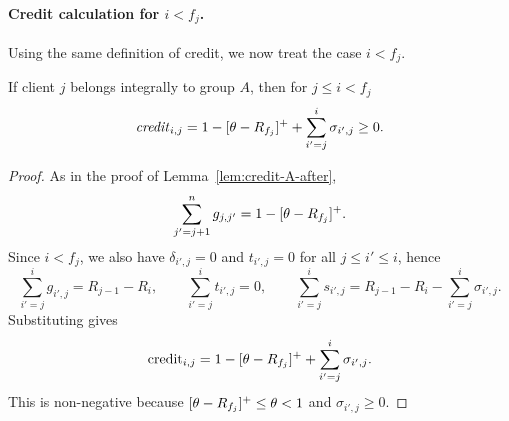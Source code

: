\paragraph{Credit calculation for \texorpdfstring{$i < f_j$}{i < f\_j}.}

Using the same definition of credit, we now treat the case $i < f_j$.


\begin{lemma}
    \label{lem:credit-A-before}
    If client $j$ belongs integrally to group $A$, then for $j \leq i < f_j$
    \begin{equation*}
        \text{\emph{credit}}_{i,j} = 1 - [\theta - R_{f_j}]^+ + \sum_{i'=j}^i \sigma_{i',j} \ge 0.
    \end{equation*}
\end{lemma}
\begin{proof}
    As in the proof of Lemma~\ref{lem:credit-A-after},
    \begin{equation*}
        \sum_{j'=j+1}^n g_{j,j'} = 1 - [\theta - R_{f_j}]^+.
    \end{equation*}
    Since $i<f_j$, we also have $\delta_{i',j}=0$ and $t_{i',j}=0$ for all $j \le i' \le i$, hence
    \begin{equation*}
        \sum_{i'=j}^{i} g_{i',j} = R_{j-1}-R_i,
        \qquad
        \sum_{i'=j}^{i} t_{i',j}=0,
        \qquad
        \sum_{i'=j}^{i} s_{i',j} = R_{j-1}-R_i-\sum_{i'=j}^{i} \sigma_{i',j}.
    \end{equation*}
    Substituting gives
    \begin{equation*}
        \text{credit}_{i,j} = 1 - [\theta - R_{f_j}]^+ + \sum_{i'=j}^{i} \sigma_{i',j}.
    \end{equation*}
    This is non-negative because $[\theta-R_{f_j}]^+ \le \theta < 1$ and $\sigma_{i',j} \ge 0$.
\end{proof}

